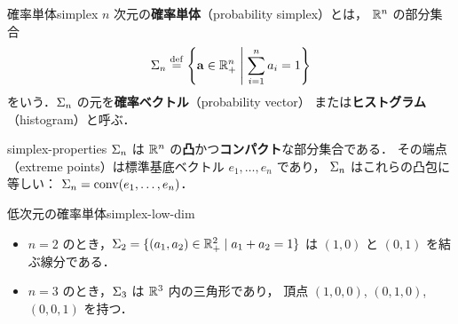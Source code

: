 \begin{definition}{確率単体}{simplex}
  $n$ 次元の\textbf{確率単体}（probability simplex）とは，
  $\mathbb{R}^n$ の部分集合
  \[
    \Sigma_n \overset{\mathrm{def}}{=}
    \left\{ \mathbf{a} \in \mathbb{R}_+^n \;\middle|\; \sum_{i=1}^n a_i = 1 \right\}
  \]
  をいう．$\Sigma_n$ の元を\textbf{確率ベクトル}（probability vector）
  または\textbf{ヒストグラム}（histogram）と呼ぶ．
\end{definition}

\begin{remark}{}{simplex-properties}
  $\Sigma_n$ は $\mathbb{R}^n$ の\textbf{凸}かつ\textbf{コンパクト}な部分集合である．
  その端点（extreme points）は標準基底ベクトル $e_1, \ldots, e_n$ であり，
  $\Sigma_n$ はこれらの凸包に等しい：
  $\Sigma_n = \operatorname{conv}(e_1, \ldots, e_n)$．
\end{remark}

\begin{example}{低次元の確率単体}{simplex-low-dim}
  \begin{itemize}
    \item $n = 2$ のとき，$\Sigma_2 = \{(a_1, a_2) \in \mathbb{R}_+^2 \mid a_1 + a_2 = 1\}$
      は $(1, 0)$ と $(0, 1)$ を結ぶ線分である．
    \item $n = 3$ のとき，$\Sigma_3$ は $\mathbb{R}^3$ 内の三角形であり，
      頂点 $(1,0,0)$, $(0,1,0)$, $(0,0,1)$ を持つ．
  \end{itemize}

  \begin{center}
  \end{center}
\end{example}

